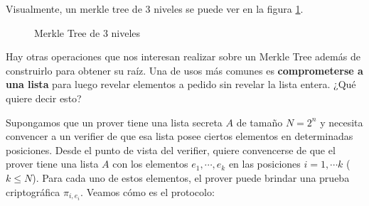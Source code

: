 Visualmente, un merkle tree de 3 niveles se puede ver en la figura \ref{fig:merkle_tree}.

\vspace{1em}

\begin{figure}
\centering
{}
\caption{Merkle Tree de 3 niveles}
\label{fig:merkle_tree}

\end{figure}

Hay otras operaciones que nos interesan realizar sobre un Merkle Tree además de construirlo para obtener su raíz. Una de usos más comunes es \textbf{comprometerse a una lista} para luego revelar elementos a pedido sin revelar la lista entera. ¿Qué quiere decir esto?

Supongamos que un prover tiene una lista secreta $A$ de tamaño $N=2^n$ y necesita convencer a un verifier de que esa lista posee ciertos elementos en determinadas posiciones. Desde el punto de vista del verifier, quiere convencerse de que el prover tiene una lista $A$ con los elementos $e_1, \cdots, e_k$ en las posiciones $i=1,\cdots k$ ($k \leq N$). Para cada uno de estos elementos, el prover puede brindar una prueba criptográfica $\pi_{i,e_i}$. Veamos cómo es el protocolo:

